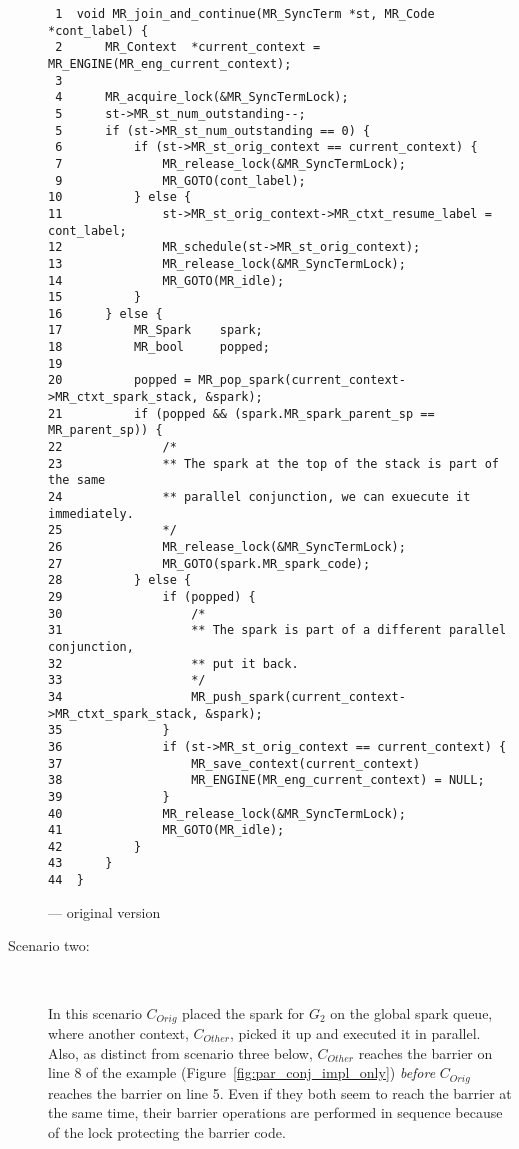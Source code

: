 \begin{description}
\begin{algorithm}[tbp]
\begin{verbatim}
 1  void MR_join_and_continue(MR_SyncTerm *st, MR_Code *cont_label) {
 2      MR_Context  *current_context = MR_ENGINE(MR_eng_current_context);
 3
 4      MR_acquire_lock(&MR_SyncTermLock);
 5      st->MR_st_num_outstanding--;
 5      if (st->MR_st_num_outstanding == 0) {
 6          if (st->MR_st_orig_context == current_context) {
 7              MR_release_lock(&MR_SyncTermLock);
 9              MR_GOTO(cont_label);
10          } else {
11              st->MR_st_orig_context->MR_ctxt_resume_label = cont_label;
12              MR_schedule(st->MR_st_orig_context);
13              MR_release_lock(&MR_SyncTermLock);
14              MR_GOTO(MR_idle);
15          }
16      } else {
17          MR_Spark    spark;
18          MR_bool     popped;
19
20          popped = MR_pop_spark(current_context->MR_ctxt_spark_stack, &spark);
21          if (popped && (spark.MR_spark_parent_sp == MR_parent_sp)) {
22              /*
23              ** The spark at the top of the stack is part of the same
24              ** parallel conjunction, we can exuecute it immediately.
25              */
26              MR_release_lock(&MR_SyncTermLock);
27              MR_GOTO(spark.MR_spark_code);
28          } else {
29              if (popped) {
30                  /*
31                  ** The spark is part of a different parallel conjunction,
32                  ** put it back.
33                  */
34                  MR_push_spark(current_context->MR_ctxt_spark_stack, &spark);
35              }
36              if (st->MR_st_orig_context == current_context) {
37                  MR_save_context(current_context)
38                  MR_ENGINE(MR_eng_current_context) = NULL;
39              }
40              MR_release_lock(&MR_SyncTermLock);
41              MR_GOTO(MR_idle);
42          }
43      }
44  }
\end{verbatim}
\caption{\joinandcontinue --- original version}
\label{alg:join_and_continue_peterw}
\end{algorithm}

    \item[Scenario two:]~

    In this scenario $C_{Orig}$ placed the spark for $G_2$ on the
    global spark queue,
    where another context, $C_{Other}$, picked it up and executed it
    in parallel.
    Also, as distinct from scenario three below,
    $C_{Other}$ reaches the barrier on line 8 of the example 
    (Figure~\ref{fig:par_conj_impl_only})
    \emph{before}
    $C_{Orig}$ reaches the barrier on line 5.
    Even if they both seem to reach the barrier at the same time,
    their barrier operations are performed in sequence because of the
    lock protecting the barrier code.


\end{description}
